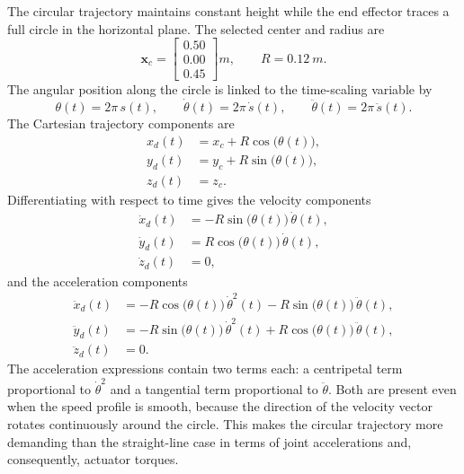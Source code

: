 \documentclass[12pt,a4paper]{article}
\begin{document}
The circular trajectory maintains constant height while the end effector traces a full circle
in the horizontal plane. The selected center and radius are
\begin{equation}
    \bm{x}_c =
    \begin{bmatrix} 0.50 \\ 0.00 \\ 0.45 \end{bmatrix}\si{m},
    \qquad R = \SI{0.12}{m}.
\end{equation}
The angular position along the circle is linked to the time-scaling variable by
\begin{equation}
    \theta(t) = 2\pi\,s(t), \qquad
    \dot{\theta}(t) = 2\pi\,\dot{s}(t), \qquad
    \ddot{\theta}(t) = 2\pi\,\ddot{s}(t).
\end{equation}
The Cartesian trajectory components are
\begin{align}
    x_d(t) &= x_c + R\cos\!\bigl(\theta(t)\bigr), \\
    y_d(t) &= y_c + R\sin\!\bigl(\theta(t)\bigr), \\
    z_d(t) &= z_c.
\end{align}
Differentiating with respect to time gives the velocity components
\begin{align}
    \dot{x}_d(t) &= -R\sin\!\bigl(\theta(t)\bigr)\,\dot{\theta}(t), \\
    \dot{y}_d(t) &=  R\cos\!\bigl(\theta(t)\bigr)\,\dot{\theta}(t), \\
    \dot{z}_d(t) &= 0,
\end{align}
and the acceleration components
\begin{align}
    \ddot{x}_d(t) &= -R\cos\!\bigl(\theta(t)\bigr)\,\dot{\theta}^2(t)
                     - R\sin\!\bigl(\theta(t)\bigr)\,\ddot{\theta}(t), \\
    \ddot{y}_d(t) &= -R\sin\!\bigl(\theta(t)\bigr)\,\dot{\theta}^2(t)
                     + R\cos\!\bigl(\theta(t)\bigr)\,\ddot{\theta}(t), \\
    \ddot{z}_d(t) &= 0.
\end{align}
The acceleration expressions contain two terms each: a centripetal term proportional to
$\dot{\theta}^2$ and a tangential term proportional to $\ddot{\theta}$. Both are present even
when the speed profile is smooth, because the direction of the velocity vector rotates
continuously around the circle. This makes the circular trajectory more demanding than the
straight-line case in terms of joint accelerations and, consequently, actuator torques.
\end{document}
